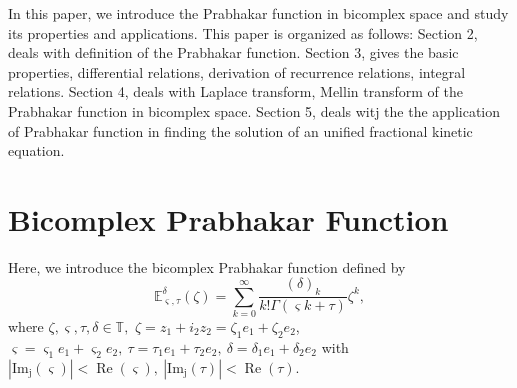 \documentclass[a4paper,12pt]{article}
\theoremstyle{remark}
\begin{document}
\noindent In this paper, we introduce the Prabhakar function  in bicomplex space and study its properties and applications. This paper is organized as follows: Section 2, deals with definition of the Prabhakar function.  Section 3, gives the basic properties, differential relations, derivation of recurrence relations, integral relations. Section 4, deals with  Laplace transform, Mellin transform of the Prabhakar function in bicomplex space. Section 5, deals witj the the application of Prabhakar function in finding the solution of an unified fractional kinetic equation. 



\section{Bicomplex Prabhakar  Function}

Here, we introduce the bicomplex Prabhakar function   defined by 
\begin{equation}\label{eq: bc ml 3 para}
\mathbb{E}_{ \varsigma,\tau}^\delta(\zeta)=\sum_{k=0}^{\infty}\frac{(\delta)_k}{k!\Gamma( \varsigma k+\tau )}\zeta^k,  \end{equation}
		where $\zeta,  \varsigma,\tau,\delta\in \mathbb{T},$ 
$\zeta= z_1+i_2z_2= \zeta_1e_1+\zeta_2e_2$, $ \varsigma=  \varsigma_1e_1+ \varsigma_2e_2,  ~ \tau=\tau_1e_1+\tau_2e_2,~\delta=\delta_1e_1+\delta_2e_2$ with $|\operatorname{Im_j}( \varsigma)|<\operatorname{Re}( \varsigma),~|\operatorname{Im_j}(\tau)|<\operatorname{Re}(\tau).$\\
\end{document}
